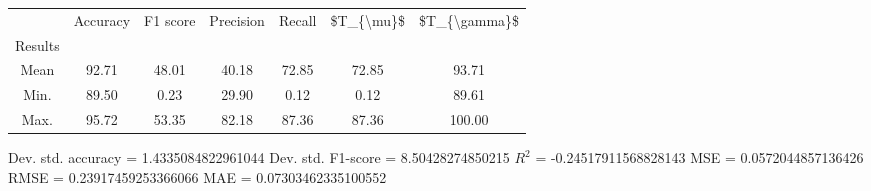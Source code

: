 \begin{tabular}{|c|c|c|c|c|c|c|}
\toprule
{} &  Accuracy &  F1 score &  Precision &  Recall &  \$T\_\{\textbackslash mu\}\$ &  \$T\_\{\textbackslash gamma\}\$ \\
Results &           &           &            &         &            &               \\
\hline
Mean    &     92.71 &     48.01 &      40.18 &   72.85 &      72.85 &         93.71 \\
Min.    &     89.50 &      0.23 &      29.90 &    0.12 &       0.12 &         89.61 \\
Max.    &     95.72 &     53.35 &      82.18 &   87.36 &      87.36 &        100.00 \\
\bottomrule
\end{tabular}

 Dev. std. accuracy = 1.4335084822961044
 Dev. std. F1-score = 8.50428274850215
 $R^2$ = -0.24517911568828143
 MSE = 0.0572044857136426
 RMSE = 0.23917459253366066
 MAE = 0.07303462335100552